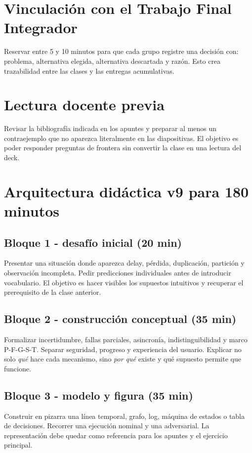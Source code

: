\documentclass[variant=docente,cover=institutional,mode=screen]{ua-engineering-v6-article}
\begin{document}
\section{Vinculación con el Trabajo Final Integrador}
Reservar entre 5 y 10 minutos para que cada grupo registre una decisión con: problema, alternativa elegida, alternativa descartada y razón. Esto crea trazabilidad entre las clases y las entregas acumulativas.
\section{Lectura docente previa}
Revisar la bibliografía indicada en los apuntes y preparar al menos un contraejemplo que no aparezca literalmente en las diapositivas. El objetivo es poder responder preguntas de frontera sin convertir la clase en una lectura del deck.

\section{Arquitectura didáctica v9 para 180 minutos}
\subsection*{Bloque 1 - desafío inicial (20 min)}
Presentar una situación donde aparezca delay, pérdida, duplicación, partición y observación incompleta. Pedir predicciones individuales antes de introducir vocabulario. El objetivo es hacer visibles los supuestos intuitivos y recuperar el prerequisito de la clase anterior.

\subsection*{Bloque 2 - construcción conceptual (35 min)}
Formalizar incertidumbre, fallas parciales, asincronía, indistinguibilidad y marco P-F-G-S-T. Separar seguridad, progreso y experiencia del usuario. Explicar no solo \emph{qué} hace cada mecanismo, sino \emph{por qué} existe y qué supuesto permite que funcione.

\subsection*{Bloque 3 - modelo y figura (35 min)}
Construir en pizarra una línea temporal, grafo, log, máquina de estados o tabla de decisiones. Recorrer una ejecución nominal y una adversarial. La representación debe quedar como referencia para los apuntes y el ejercicio principal.
\end{document}
